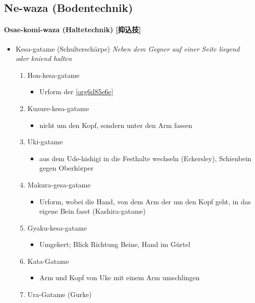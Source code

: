 \documentclass[justified, a4paper, notitlepage, captions=tableheading, nobib]{tufte-handout}
\begin{document}
\subsection{Ne-waza (Bodentechnik)}
\label{sec:orgbd639a6}
\paragraph{Osae-komi-waza (Haltetechnik) [抑込技] }
\label{sec:orgba3ee0e}
\begin{itemize}
\item \label{org6d85e6e}Kesa-gatame (Schulterschärpe)
\emph{Neben dem Gegner auf einer Seite liegend oder kniend halten}

\begin{enumerate}
\item \label{orgac0a1d5}Hon-kesa-gatame 
\begin{itemize}
\item Urform der \ref{org6d85e6e}
\end{itemize}
\item \label{orgc8ed1bd}Kuzure-kesa-gatame 
\begin{itemize}
\item nicht um den Kopf, sondern unter den Arm fassen
\end{itemize}
\item \label{org53b57ad}Uki-gatame         
\begin{itemize}
\item aus dem Ude-hishigi in die Festhalte wechseln (Eckersley), Schienbein gegen Oberkörper
\end{itemize}
\item \label{orgaa8dd24}Makura-gesa-gatame 
\begin{itemize}
\item Urform, wobei die Hand, von dem Arm der um den Kopf geht, in das eigene Bein fasst (Kashira-gatame)
\end{itemize}
\item \label{orgd47c42d}Gyaku-kesa-gatame  
\begin{itemize}
\item Umgekert; Blick Richtung Beine, Hand im Gürtel
\end{itemize}
\item \label{org52b0dc1}Kata-Gatame 
\begin{itemize}
\item Arm und Kopf von Uke mit einem Arm umschlingen
\end{itemize}
\item \label{org129be2a}Ura-Gatame (\label{org375244e}Gurke)
\end{enumerate}


\end{itemize}
\end{document}
